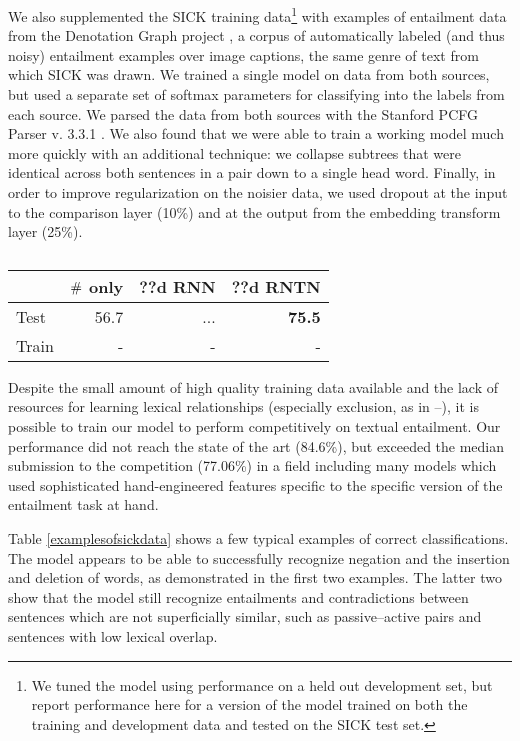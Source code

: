 We also supplemented the SICK training data\footnote{We tuned the model using performance on a held out development set, but report performance here for a version of the model trained on both the training and development data and tested on the SICK test set.} with  examples of entailment data from the Denotation Graph project \cite{hodoshimage}, a corpus of automatically labeled (and thus noisy) entailment examples over image captions, the same genre of text from which SICK was drawn. We trained a single model on data from both sources, but used a separate set of softmax parameters for classifying into the labels from each source. We parsed the data from both sources with the Stanford PCFG Parser v. 3.3.1 \cite{klein2003accurate}. We also found that we were able to train a working model much more quickly with an additional technique: we collapse subtrees that were identical across both sentences in a pair down to a single head word. Finally, in order to improve regularization on the noisier data, we used dropout \cite{hinton2012improving} at the input to the comparison layer (10\%) and at the output from the embedding transform layer (25\%). 

\begin{table}[tp]
  \centering \small
  \begin{tabular}{ l r@{ \ } r@{ \ } r@{ \ } }
    \toprule
    ~&\multicolumn{1}{c}{$\mathbin{\#}$ only} & \multicolumn{1}{c}{??d RNN}  & \multicolumn{1}{c}{??d RNTN}\\
    \midrule
    Test & 56.7 &	...& \textbf{75.5} \\
    Train &- &- &-  \\
    \bottomrule
  \end{tabular}
  \caption{}
  \label{sresultstable}
\end{table} 

Despite the small amount of high quality training data available and the lack of resources for learning lexical relationships (especially exclusion, as in --), it is possible to train our model to perform competitively on textual entailment. Our performance did not reach the state of the art (84.6\%), but exceeded the median submission to the competition (77.06\%) in a field including many models which used sophisticated hand-engineered features specific to the specific version of the entailment task at hand.

Table \ref{examplesofsickdata} shows a few typical examples of correct classifications. The model appears to be able to successfully recognize negation and the insertion and deletion of words, as demonstrated in the first two examples. The latter two show that the model still recognize entailments and contradictions between sentences which are not superficially similar, such as passive--active pairs and sentences with low lexical overlap.